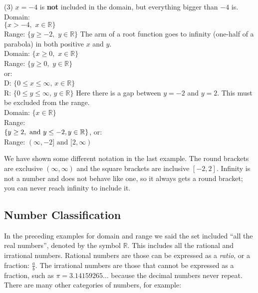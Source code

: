 \begin{tasks}(3)
	\task $x=-4$ is \textbf{not} included in the domain, but everything bigger than $-4$ is.\\ Domain:\\ $\{x>-4,\,\, x\in\mathbb{R}\}$\\ Range: $\{y\ge-2,\,\, y\in\mathbb{R}\}$
	\task The arm of a root function goes to infinity (one-half of a parabola) in both positive $x$ and $y$.\\ Domain: $\{x\ge0,\,\, x\in\mathbb{R}\}$\\ Range: $\{y\ge0,\,\, y\in\mathbb{R}\}$\\or:\\
	D: $\{0\le x\le\infty,\, x\in\mathbb{R}\}$\\
	R: $\{0\le y\le\infty,\, y\in\mathbb{R}\}$
	\task Here there is a gap between $y=-2$ and $y=2$. This must be excluded from the range.\\
	Domain: $\{x\in\mathbb{R}\}$\\ 
	Range:\\$\{y\ge2,\text{ and } y\le-2,\\y\in\mathbb{R}\}$, or:\\
	Range: $(\infty,-2] \text{ and } [2,\infty)$	
\end{tasks}
We have shown some different notation in the last example. The round brackets are exclusive $(\infty,\infty)$ and the square brackets are inclusive $[-2,2]$. Infinity is not a number and does not behave like one, so it always gets a round bracket; you can never reach infinity to include it.

\subsection*{Number Classification}
In the preceding examples for domain and range we said the set included ``all the real numbers'', denoted by the symbol $\mathbb{R}$. This includes all the rational and irrational numbers. Rational numbers are those can be expressed as a \textit{ratio}, or a fraction: $\frac{a}{b}$. The irrational numbers are those that cannot be expressed as a fraction, such as $\pi=3.14159265\dots$ because the decimal numbers never repeat. There are many other categories of numbers, for example:


